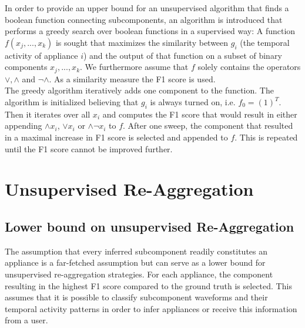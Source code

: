 \begin{description}
In order to provide an upper bound for an unsupervised algorithm that finds a boolean function connecting subcomponents, an algorithm is introduced that performs a greedy search over boolean functions in a supervised way: A function $f(x_j,...,x_k)$ is sought that maximizes the similarity between $g_i$ (the temporal activity of appliance $i$) and the output of that function on a subset of binary components $x_j,... ,x_k$. We furthermore assume that $f$ solely contains the operators $\lor, \land$ and $\neg \land$. As a similarity measure the F1 score is used.\\
The greedy algorithm iteratively adds one component to the function. The algorithm is initialized believing that $g_i$ is always turned on, i.e. $f_0 = (1)^T$. Then it iterates over all $x_i$ and computes the F1 score that would result in either appending $\land x_i$, $\lor x_i$ or $\land \neg x_i$ to $f$. After one sweep, the component that resulted in a maximal increase in F1 score is selected and appended to $f$. This is repeated until the F1 score cannot be improved further.
\end{description}
 
 \section{Unsupervised Re-Aggregation}
 \subsection{Lower bound on unsupervised Re-Aggregation}
 The assumption that every inferred subcomponent readily constitutes an appliance is a far-fetched assumption but can serve as a lower bound for unsupervised re-aggregation strategies. For each appliance, the component resulting in the highest F1 score compared to the ground truth is selected. This assumes that it is possible to classify subcomponent waveforms and their temporal activity patterns in order to infer appliances or receive this information from a user.
 
